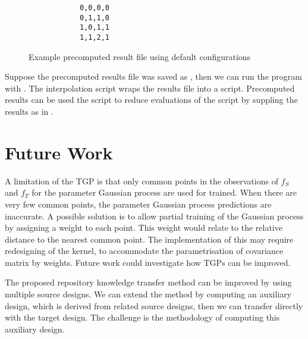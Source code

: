 \documentclass[10pt,a4paper]{article}
\begin{document}
\begin{figure}[H]
	\begin{framed}
		\begin{verbatim}
			0,0,0,0
			0,1,1,0
			1,0,1,1
			1,1,2,1
		\end{verbatim}
	\end{framed}
	\caption{Example precomputed result file using default configurations}
\end{figure}

Suppose the precomputed results file was saved as , then we can run the program with . The interpolation script wraps the results file into a script. Precomputed results can be used the script to reduce evaluations of the script by suppling the results as in .

\section{Future Work}

A limitation of the TGP is that only common points in the observations of $f_S$ and $f_T$ for the parameter Gaussian process are used for trained. When there are very few common points, the parameter Gaussian process predictions are inaccurate. A possible solution is to allow partial training of the Gaussian process by assigning a weight to each point. This weight would relate to the relative distance to the nearest common point. The implementation of this may require redesigning of the kernel, to accommodate the parametrisation of covariance matrix by weights. Future work could investigate how TGPs can be improved.

The proposed repository knowledge transfer method can be improved by using multiple source designs. We can extend the method by computing an auxiliary design, which is derived from related source designs, then we can transfer directly with the target design. The challenge is the methodology of computing this auxiliary design.



\end{document}
